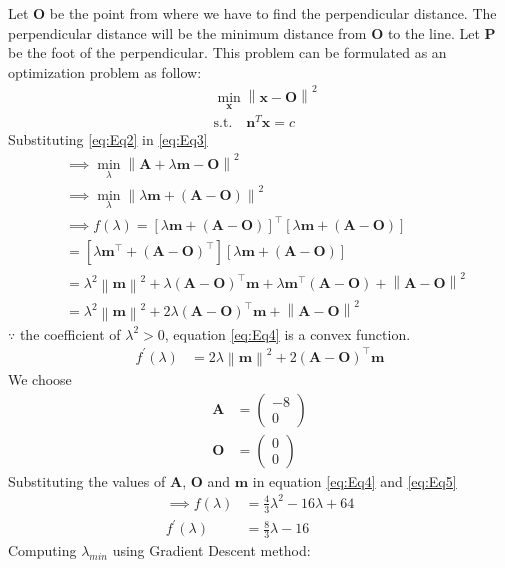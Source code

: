 \documentclass[12pt]{article}
\providecommand{\brak}[1]{\ensuremath{\left(#1\right)}}
\providecommand{\sbrak}[1]{\ensuremath{{}\left[#1\right]}}
\providecommand{\norm}[1]{\left\lVert#1\right\rVert}
\newcommand{\myvec}[1]{\ensuremath{\begin{pmatrix}#1\end{pmatrix}}}
\let\vec\mathbf
\begin{document}
\begin{enumerate}
Let $\vec{O}$ be the point from where we have to find the perpendicular distance. The perpendicular distance will be the minimum distance from $\vec{O}$ to the line. Let $\vec{P}$ be the foot of the perpendicular. This problem can be formulated as an optimization problem as follow:
\begin{align}
	\label{eq:Eq3}
	&  \min_{\vec{x}} \norm{\vec{x}-\vec{O}}^2\\
	& \text{s.t.} \quad \vec{n}^T\vec{x} = c 
\end{align}
Substituting \eqref{eq:Eq2} in \eqref{eq:Eq3}
\begin{align}
	& \implies \min_{\lambda} \norm{ \vec{A}+\lambda\vec{m} -\vec{O}}^2\\
	& \implies \min_{\lambda} \norm{ \lambda\vec{m} +\brak{\vec{A}-\vec{O}}}^2\\
	&\implies f\brak{\lambda} = \sbrak{\lambda\vec{m}+ \brak{\vec{A}-\vec{O}}}^\top \sbrak{\lambda\vec{m}+ \brak{\vec{A}-\vec{O}}} \\  
	&= \sbrak{\lambda\vec{m^\top}+ \brak{\vec{A}-\vec{O}}^\top} \sbrak{\lambda\vec{m}+ \brak{\vec{A}-\vec{O}}} \\  
	&= \lambda^2\norm{\vec{m}}^2+ \lambda\brak{\vec{A}-\vec{O}}^\top\vec{m}+ \lambda\vec{m}^\top\brak{\vec{A}-\vec{O}}+ \norm{\vec{A}-\vec{O}}^2 \\  
	\label{eq:Eq4}
	&= \lambda^2\norm{\vec{m}}^2+ 2\lambda\brak{\vec{A}-\vec{O}}^\top\vec{m}+ \norm{\vec{A}-\vec{O}}^2  
\end{align}
$\because$ the coefficient of $\lambda^2> 0$, equation \eqref{eq:Eq4} is a convex function.
\begin{align}
	\label{eq:Eq5}
	f^\prime\brak{\lambda} &= 2\lambda\norm{\vec{m}}^2+ 2\brak{\vec{A}-\vec{O}}^\top\vec{m}
\end{align}	
We choose  
\begin{align}
	\vec{A} &= \myvec{-8 \\ 0}\\
	\vec{O} &= \myvec{ 0 \\ 0}
\end{align}
Substituting the values of $\vec{A}$, $\vec{O}$ and $\vec{m}$ in equation \eqref{eq:Eq4} and \eqref{eq:Eq5}
\begin{align}
	\label{eq:Eq6}
	\implies f\brak{\lambda} &= \frac{4}{3}\lambda^2-16\lambda+64 \\ 
	f^\prime\brak{\lambda} &= \frac{8}{3}\lambda - 16
\end{align}
Computing $\lambda_{min}$ using Gradient Descent method:
\begin{align}

\end{align}
\end{enumerate}
\end{document}
